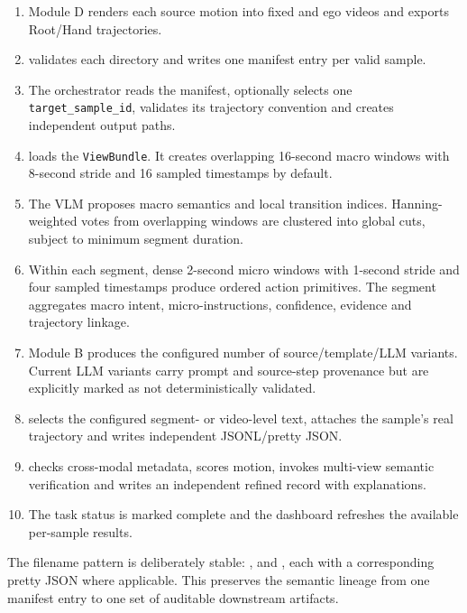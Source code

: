 \documentclass[11pt,oneside]{report}
\begin{document}
\begin{enumerate}
    \item Module D renders each source motion into fixed and ego videos and
    exports Root/Hand trajectories.
    \item {} validates each directory and
    writes one manifest entry per valid sample.
    \item The orchestrator reads the manifest, optionally selects one
    \texttt{target\_sample\_id}, validates its trajectory convention and creates
    independent output paths.
    \item {} loads the \texttt{ViewBundle}. It creates
    overlapping 16-second macro windows with 8-second stride and 16 sampled
    timestamps by default.
    \item The VLM proposes macro semantics and local transition indices.
    Hanning-weighted votes from overlapping windows are clustered into global
    cuts, subject to minimum segment duration.
    \item Within each segment, dense 2-second micro windows with 1-second stride
    and four sampled timestamps produce ordered action primitives. The segment
    aggregates macro intent, micro-instructions, confidence, evidence and
    trajectory linkage.
    \item Module B produces the configured number of source/template/LLM
    variants. Current LLM variants carry prompt and source-step provenance but
    are explicitly marked as not deterministically validated.
    \item {} selects the configured segment- or
    video-level text, attaches the sample's real trajectory and writes
    independent JSONL/pretty JSON.
    \item {} checks cross-modal metadata, scores
    motion, invokes multi-view semantic verification and writes an independent
    refined record with explanations.
    \item The task status is marked complete and the dashboard refreshes the
    available per-sample results.
\end{enumerate}

The filename pattern is deliberately stable:
,
 and
, each with a corresponding pretty JSON
where applicable. This preserves the semantic lineage from one manifest entry
to one set of auditable downstream artifacts.
\end{document}
